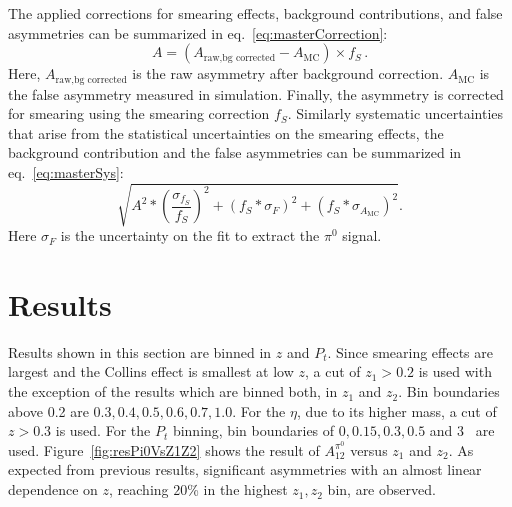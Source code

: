 \documentclass[aps,prX,preprint,groupedaddress,linenumbers]{revtex4-1}
\begin{document}
The applied corrections for smearing effects, background contributions, and false asymmetries can be summarized in eq.~\eqref{eq:masterCorrection}:
\begin{equation}
A=(A_\textrm{raw,bg corrected}-A_\textrm{MC})\times f_S\, .
\label{eq:masterCorrection}
\end{equation}
Here, $A_\textrm{raw,bg corrected}$ is the raw asymmetry after background correction.
$A_\textrm{MC}$ is the false asymmetry measured in simulation.
Finally, the asymmetry is corrected for smearing using the smearing correction $f_S$.
Similarly systematic uncertainties that arise from the statistical uncertainties on the smearing effects, the background contribution and the false asymmetries can be summarized in eq.~\eqref{eq:masterSys}:
\begin{equation}
\sqrt{ A^2*(\frac{\sigma_{f_S}}{f_S})^2+(f_S*\sigma_F)^2+(f_S*\sigma_{A_\textrm{MC}})^2}.
\label{eq:masterSys}
 \end{equation}
 Here $\sigma_F$ is the uncertainty on the fit to extract the $\pi^0$ signal. 
 

\section{Results}
\label{sec:results}
Results shown in this section are binned in $z$ and $P_t$. 
Since smearing effects are largest and the Collins effect is smallest at low $z$, a cut of $z_1>0.2$ is used with the exception of the results which are binned both, in $z_1$ and $z_2$. Bin boundaries above 0.2 are $0.3,0.4, 0.5, 0.6, 0.7,1.0$. For the $\eta$, due to its higher mass, a  cut of $z>0.3$ is used. For the $P_t$ binning, bin boundaries of $0,0.15,0.3,0.5$  and $3$~ are used. 
Figure~\ref{fig:resPi0VsZ1Z2} shows the result of $A^{\pi^0}_{12}$ versus $z_1$ and $z_2$. As expected from previous results, significant asymmetries with an almost linear dependence on $z$, reaching $20$\% in the highest $z_1,z_2$ bin, are observed. 
\end{document}

